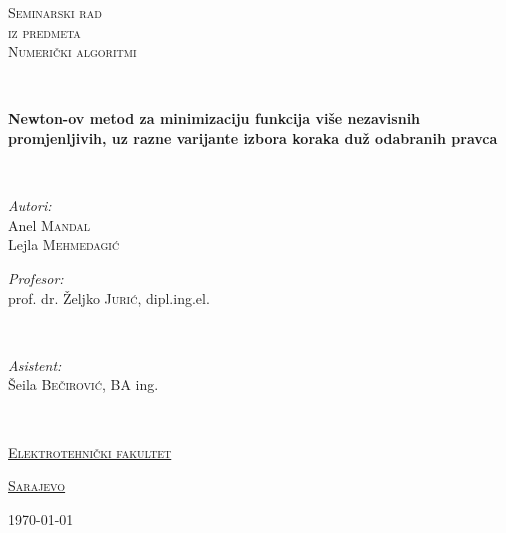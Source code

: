 \documentclass[bosnian,12pt,a4paper]{report}
\def\frontmatter{%
    \pagenumbering{roman}
    \setcounter{page}{1}
	\renewcommand{\thesection}{\Roman{section}}
}%
\begin{document}
	\frontmatter
	\pagestyle{plain}
	
	\begin{titlepage}
	
	
		\begin{center}
		\textsc{\huge Seminarski rad}\\[0.3cm] 
		\textsc{\Large iz predmeta}\\[0.3cm] 
		\textsc{\huge Numerički algoritmi} \\
		\vspace{1.5cm}
		
		\hrulefill \\[0.2cm]
		{\huge \bfseries Newton-ov metod za minimizaciju funkcija više nezavisnih promjenljivih, uz razne varijante izbora koraka duž odabranih pravca \par}\vspace{0.2cm}
		\hrulefill \\[2cm]
		
		
		\begin{minipage}[t]{\textwidth}
			\begin{flushleft} \large
				\emph{Autori:}\\[0.1cm]
				{Anel \textsc{Mandal} \\
				 Lejla \textsc{Mehmedagić}}
			\end{flushleft}
		\end{minipage}
		\begin{minipage}[t]{\textwidth}	
			\begin{flushright} \large
				\emph{Profesor:} \\
				{prof. dr. Željko \textsc{Jurić}, dipl.ing.el.}  
			\end{flushright}
		\end{minipage}\\[0.5cm]
		\begin{minipage}[t]{\textwidth}	
			\begin{flushright} \large
				\emph{Asistent:} \\
				{Šeila \textsc{Bečirović}, BA ing.}  
			\end{flushright}
		\end{minipage}\\[3cm]
		
		
		{\scshape\LARGE \href{http://etf.unsa.ba/}{Elektrotehnički fakultet}\par}\vspace{0.25cm}
		{\scshape\LARGE \href{https://en.wikipedia.org/wiki/Sarajevo}{Sarajevo} \par}\vspace{4cm}
		\vfill
		
		{\large \today}
		\vfill
		\end{center}
	\end{titlepage}
\end{document}
